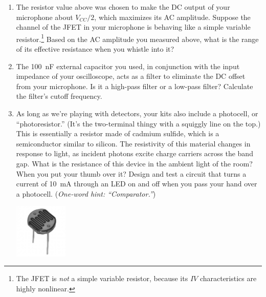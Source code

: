 \begin{enumerate}[wide]
\item The resistor value above was chosen to make the DC output of your microphone about $V_{CC}/2$, which maximizes its AC amplitude.  Suppose the channel of the JFET in your microphone is behaving like a simple variable resistor.\footnote{The JFET is \textit{not} a simple variable resistor, because its $IV$ characteristics are highly nonlinear.}  Based on the AC amplitude you measured above, what is the range of its effective resistance when you whistle into it?


\item The 100~nF external capacitor you used, in conjunction with the input impedance of your oscilloscope, acts as a filter to eliminate the DC offset from your microphone.  Is it a high-pass filter or a low-pass filter?  Calculate the filter's cutoff frequency.

\item As long as we're playing with detectors, your kits also include a photocell, or ``photoresistor.''  (It's the two-terminal thingy with a squiggly line on 
the top.) This is essentially a resistor made 
of cadmium sulfide, which is a semiconductor similar to silicon.  The resistivity of this material changes in response to light, 
as incident photons excite charge carriers across the band gap.  What is the resistance of this device in the ambient light of the room?  When you put your thumb over it?  Design and test a circuit that turns a current of 10~mA through an LED on and off  when you pass your hand over a photocell.  (\textit{One-word hint: ``Comparator.''})
\begin{center}
\includegraphics[width=1in]{microphone_photocell/photocell_bw.jpg}
\end{center}


\end{enumerate}
